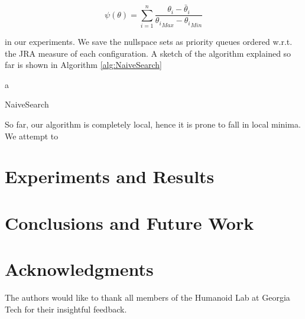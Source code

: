 \documentclass[conference]{IEEEtran}
\newcommand{\q}{ \ensuremath{\theta } }
\begin{document}
\begin{equation}
\psi(\q)=  \displaystyle \sum_{i=1}^{n} \dfrac{ \q_{i} - {\bar{\q}}_{i} }{ {\q_{i}}_{Max} - {\q_{i}}_{Min} }
\end{equation}

in our experiments. We save the nullspace sets as priority queues ordered w.r.t. the JRA measure of each configuration. A sketch
of the algorithm explained so far is shown in Algorithm \ref{alg:NaiveSearch}

\begin{algorithm}
{} %
\BlankLine
{}
\BlankLine

\Return a \;
\caption{ NaiveSearch }
\label{alg:NaiveSearch}
\end{algorithm}

So far, our algorithm is completely local, hence it is prone to fall in local minima. We attempt to 





\section{Experiments and Results}
\label{sec:Experiments}


\section{Conclusions and Future Work}
\label{sec:Conclusions}


\section*{Acknowledgments}
The authors would like to thank all members of the Humanoid Lab
at Georgia Tech for their insightful feedback.



\end{document}
